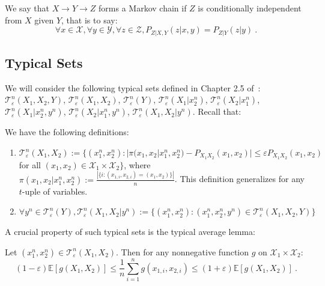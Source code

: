 \begin{definition}
We say that $X \rightarrow Y \rightarrow Z$ forms a Markov chain if $Z$ is conditionally independent from $X$ given $Y$, that is to say:
\[\forall x \in \mathcal{X},\forall y \in \mathcal{Y},\forall z \in \mathcal{Z}, P_{Z|X,Y}(z|x,y) = P_{Z|Y}(z|y)   \ .\]
\end{definition}

\subsection{Typical Sets}
\label{subsection:typicalSets}
We will consider the following typical sets defined in Chapter 2.5 of~\cite{GK11}: $\mathcal{T}^n_{\varepsilon}(X_1,X_2,Y)$, $\mathcal{T}^n_{\varepsilon}(X_1,X_2)$, $\mathcal{T}^n_{\varepsilon}(Y)$, $\mathcal{T}^n_{\varepsilon}(X_1|x_2^n)$, $\mathcal{T}^n_{\varepsilon}(X_2|x_1^n)$, $\mathcal{T}^n_{\varepsilon}(X_1|x_2^n,y^n)$, $\mathcal{T}^n_{\varepsilon}(X_2|x_1^n,y^n)$, $\mathcal{T}^n_{\varepsilon}(X_1,X_2|y^n)$. Recall that:
      \begin{definition}
        We have the following definitions:
        \begin{enumerate}
        \item $\mathcal{T}^n_{\varepsilon}(X_1,X_2) := \{(x_1^n,x_2^n) : |\pi(x_1,x_2|x_1^n,x_2^n) - P_{X_1X_2}(x_1,x_2)|\leq \varepsilon P_{X_1X_2}(x_1,x_2)$ for all $(x_1,x_2) \in \mathcal{X}_1 \times \mathcal{X}_2\}$, where $\pi(x_1,x_2|x_1^n,x_2^n) := \frac{|\{i : (x_{1,i},x_{2,i}) = (x_1,x_2)\}|}{n}$. This definition generalizes for any $t$-uple of variables.
    \item $\forall y^n \in \mathcal{T}^n_{\varepsilon}(Y), \mathcal{T}^n_{\varepsilon}(X_1,X_2|y^n) := \{ (x_1^n,x_2^n) : (x_1^n,x_2^n,y^n) \in \mathcal{T}^n_{\varepsilon}(X_1,X_2,Y) \}$
        \end{enumerate}
      \end{definition}

      A crucial property of such typical sets is the typical average lemma:

      \begin{lemma}
        Let $(x_1^n,x_2^n) \in \mathcal{T}^n_{\varepsilon}(X_1,X_2)$. Then for any nonnegative function $g$ on $\mathcal{X}_1\times\mathcal{X}_2$:
        \[ (1-\varepsilon)\mathbb{E}[g(X_1,X_2)] \leq \frac{1}{n}\sum_{i=1}^ng(x_{1,i},x_{2,i}) \leq (1+\varepsilon)\mathbb{E}[g(X_1,X_2)] \ . \]
      \end{lemma}
      
